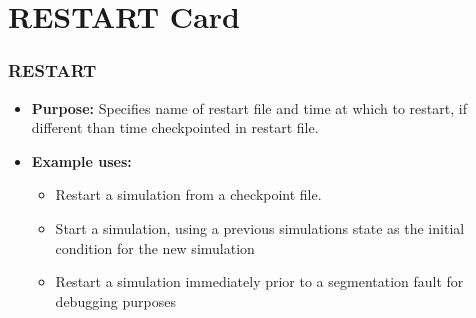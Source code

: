 \section{RESTART Card}

\begin{frame}\frametitle{RESTART}

\begin{itemize}{}
\item[] \textbf{Purpose:} Specifies name of restart file and time at which to restart, if different than time checkpointed in restart file.

\item[] \textbf{Example uses:}
\begin{itemize}
\item Restart a simulation from a checkpoint file.
\item Start a simulation, using a previous simulations state as the initial condition for the new simulation
\item Restart a simulation immediately prior to a segmentation fault for debugging purposes
\end{itemize}
\end{itemize}

\end{frame}


